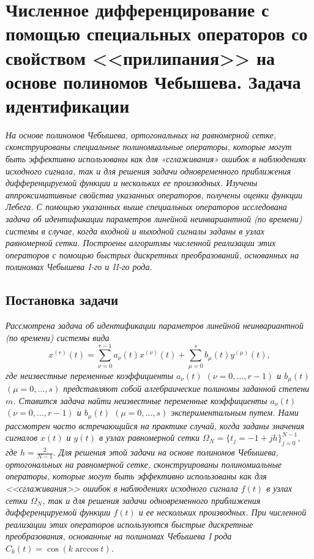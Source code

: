 \section{Численное дифференцирование с помощью специальных операторов со свойством <<прилипания>> на основе полиномов Чебышева. Задача идентификации}\label{sect-identification}\label{sect-2.2}
\textit{
На основе полиномов Чебышева, ортогональных на равномерной сетке, сконструированы специальные полиномиальные операторы, которые могут быть эффективно использованы как для «сглаживания» ошибок в наблюдениях исходного сигнала, так и для решения задачи одновременного приближения дифференцируемой функции и нескольких ее производных. Изучены аппроксимативные свойства указанных операторов, получены оценки функции Лебега.
С помощью указанных выше специальных операторов исследована задача об идентификации параметров линейной неинвариантной (по времени) системы в случае, когда входной и выходной сигналы заданы в узлах равномерной сетки. Построены алгоритмы численной реализации этих операторов с помощью быстрых дискретных преобразований, основанных на полиномах Чебышева I-го и II-го рода.}





\subsection{Постановка задачи}

\textit{ Рассмотрена задача об идентификации параметров линейной неинвариантной (по времени) системы вида
\begin{equation*}
x^{(r)}(t)=\sum_{\nu=0}^{r-1}a_\nu(t)x^{(\nu)}(t)+\sum_{\mu=0}^s b_\mu(t)y^{(\mu)}(t),
\end{equation*}
где неизвестные переменные коэффициенты $a_\nu(t)$ $(\nu=0,\ldots,r-1)$ и $b_\mu(t)$ $(\mu=0,\ldots,s)$ представляют собой алгебраические полиномы  заданной степени $m$. Ставится задача  найти неизвестные переменные коэффициенты $a_\nu(t)$ $(\nu=0,\ldots,r-1)$ и $b_\mu(t)$ $(\mu=0,\ldots,s)$ экспериментальным путем.
Нами рассмотрен часто встречающийся на практике случай, когда заданы значения сигналов $x(t)$ и  $y(t)$ в узлах равномерной сетки $\Omega_N=\{t_j=-1+jh\}_{j=0}^{N-1}$, где $h=\frac2{N-1}$.
Для решения этой задачи на основе полиномов Чебышева, ортогональных на равномерной сетке, сконструированы полиномиальные операторы, которые могут быть эффективно использованы как для <<сглаживания>> ошибок в наблюдениях исходного сигнала $f(t)$ в узлах сетки $\Omega_N$, так и для решения задачи одновременного приближения дифференцируемой функции $f(t)$ и ее нескольких производных. При численной реализации этих операторов используются быстрые дискретные преобразования, основанные на полиномах Чебышева I рода $C_k(t) = \cos (k \arccos t)$.
}

